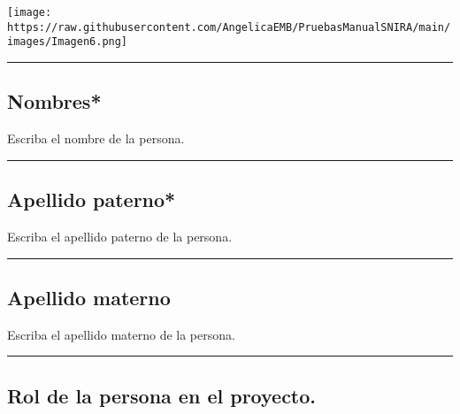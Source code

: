 \documentclass[
]{book}
\begin{document}
\texttt{[image: https://raw.githubusercontent.com/AngelicaEMB/PruebasManualSNIRA/main/images/Imagen6.png]}

\begin{center}\rule{0.5\linewidth}{0.5pt}\end{center}

\hypertarget{nombres}{%
\subsection*{\texorpdfstring{{Nombres*}}{Nombres*}}\label{nombres}}

Escriba el nombre de la persona.

\begin{center}\rule{0.5\linewidth}{0.5pt}\end{center}

\hypertarget{apellido-paterno}{%
\subsection*{\texorpdfstring{{Apellido paterno*}}{Apellido paterno*}}\label{apellido-paterno}}

Escriba el apellido paterno de la persona.

\begin{center}\rule{0.5\linewidth}{0.5pt}\end{center}

\hypertarget{apellido-materno}{%
\subsection*{Apellido materno}\label{apellido-materno}}

Escriba el apellido materno de la persona.

\begin{center}\rule{0.5\linewidth}{0.5pt}\end{center}

\hypertarget{rol-de-la-persona-en-el-proyecto.}{%
\subsection*{Rol de la persona en el proyecto.}\label{rol-de-la-persona-en-el-proyecto.}}
\end{document}
